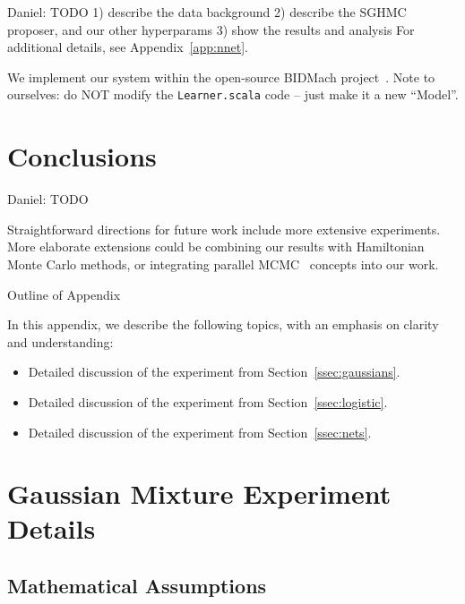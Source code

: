 \documentclass{article}
\begin{document}
{\color{blue}
Daniel: TODO
1) describe the data background
2) describe the SGHMC proposer, and our other hyperparams
3) show the results and analysis
For additional details, see Appendix~\ref{app:nnet}.
}

We implement our system within the open-source BIDMach project~\cite{canny2013bidmach}. Note to
ourselves: do NOT modify the \texttt{Learner.scala} code -- just make it a new ``Model''.




\section{Conclusions}\label{sec:conclusion}

{\color{blue}
Daniel: TODO
}

Straightforward directions for future work include more extensive experiments. More elaborate
extensions could be combining our results with Hamiltonian Monte Carlo methods, or integrating
parallel MCMC~\cite{conf/uai/AngelinoKWSA14} concepts into our work.


\small


\normalsize

\clearpage
\appendix

\begin{center}
{\Large Outline of Appendix}
\end{center}

In this appendix, we describe the following topics, with an emphasis on clarity and understanding:

\begin{itemize}[noitemsep]
    \item Detailed discussion of the experiment from Section~\ref{ssec:gaussians}.
    \item Detailed discussion of the experiment from Section~\ref{ssec:logistic}.
    \item Detailed discussion of the experiment from Section~\ref{ssec:nets}.
\end{itemize}

\section{Gaussian Mixture Experiment Details}\label{app:gaussian}

\subsection{Mathematical Assumptions}
\end{document}
